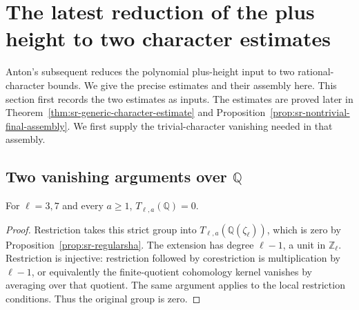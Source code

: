 \section{The latest reduction of the plus height to two character estimates}
\label{sec:sr-two-counts}
Anton's subsequent
\href{https://github.com/antoshashakov/riemann-hypothesis/blob/76ffabc62ab67b126afc128013ab6efa6f7d2a7c/verification/TwoCharacterCounts.lean}{}
reduces the polynomial plus-height input to two rational-character
bounds. We give the precise estimates and their assembly here.
This section first records the two estimates as inputs.
The estimates are proved later in
Theorem~\ref{thm:sr-generic-character-estimate} and
Proposition~\ref{prop:sr-nontrivial-final-assembly}.
We first supply the trivial-character vanishing needed in that assembly.

\subsection{Two vanishing arguments over \(\mathbb Q\)}
\begin{srproposition}\label{prop:sr-rational-regular}
For \(\ell=3,7\) and every \(a\geq1\),
\(T_{\ell,a}(\mathbb Q)=0\).
\end{srproposition}
\begin{proof}
Restriction takes this strict group into
\(T_{\ell,a}(\mathbb Q(\zeta_\ell))\), which is zero by
Proposition~\ref{prop:sr-regularsha}.
The extension has degree \(\ell-1\), a unit in \(\mathbb Z_\ell\).
Restriction is injective: restriction followed by corestriction is
multiplication by \(\ell-1\), or equivalently the finite-quotient
cohomology kernel vanishes by averaging over that quotient.
The same argument applies to the local restriction conditions.
Thus the original group is zero.
\end{proof}

